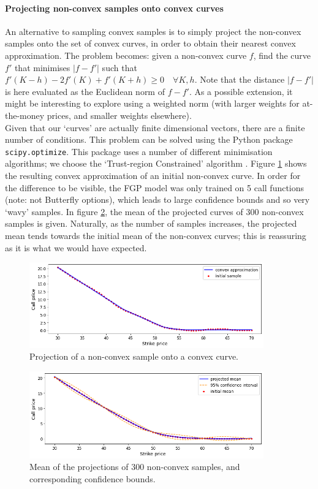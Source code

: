 \documentclass[a4paper,12pt]{article}
\begin{document}
\paragraph{Projecting non-convex samples onto convex curves \label{sec:na_projection}}
An alternative to sampling convex samples is to simply project the non-convex samples onto the set of convex curves, in order to obtain their nearest convex approximation. The problem becomes: given a non-convex curve $f$, find the curve $f'$ that minimises $|f-f'|$ such that $f'(K-h) - 2 f'(K) + f'(K+h) \geq 0 \quad \forall K, h$. Note that the distance $|f-f'|$ is here evaluated as the Euclidean norm of $f-f'$. As a possible extension, it might be interesting to explore using a weighted norm (with larger weights for at-the-money prices, and smaller weights elsewhere).\\
Given that our `curves' are actually finite dimensional vectors, there are a finite number of conditions. This problem can be solved using the Python package \texttt{scipy.optimize}. This package uses a number of different minimisation algorithms; we choose the `Trust-region Constrained' algorithm \cite{scipy.optimise}. Figure \ref{fig:fgp_projected_sample} shows the resulting convex approximation of an initial non-convex curve. In order for the difference to be visible, the FGP model was only trained on 5 call functions (note: not Butterfly options), which leads to large confidence bounds and so very `wavy' samples. In figure \ref{fig:fgp_projected_mean}, the mean of the projected curves of 300 non-convex samples is given. Naturally, as the number of samples increases, the projected mean tends towards the initial mean of the non-convex curves; this is reassuring as it is what we would have expected.
\begin{figure} [H]
    \centering
    \includegraphics[width=0.9\textwidth]{fgp_projected_sample.png}
    \caption{Projection of a non-convex sample onto a convex curve.}
    \label{fig:fgp_projected_sample}
\end{figure}
\begin{figure} [H]
    \centering
    \includegraphics[width=0.9\textwidth]{fgp_projected_mean.png}
    \caption{Mean of the projections of 300 non-convex samples, and corresponding confidence bounds.}
    \label{fig:fgp_projected_mean}
\end{figure}
\end{document}
